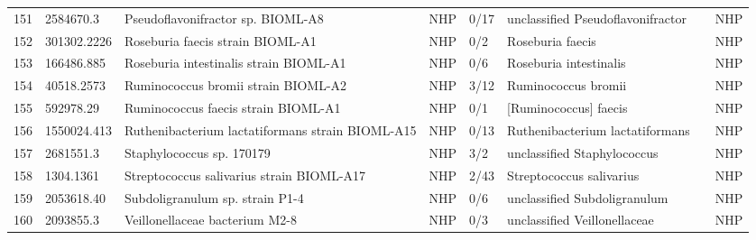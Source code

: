 \begin{longtable}{llllllll}
151 &     2584670.3 &                                        Pseudoflavonifractor sp. BIOML-A8 &   NHP &      0/17 &              unclassified Pseudoflavonifractor &      \cite{poyet2019library,ricaboni2017pseudoflavonifractor} &   NHP \\
152 &   301302.2226 &                                         Roseburia faecis strain BIOML-A1 &   NHP &       0/2 &                               Roseburia faecis &                    \cite{poyet2019library,duncan2006proposal} &   NHP \\
153 &    166486.885 &                                   Roseburia intestinalis strain BIOML-A1 &   NHP &       0/6 &                         Roseburia intestinalis &                           \cite{poyet2019library,la2019human} &   NHP \\
154 &    40518.2573 &                                      Ruminococcus bromii strain BIOML-A2 &   NHP &      3/12 &                            Ruminococcus bromii &                          \cite{poyet2019library,ze2015unique} &   NHP \\
155 &     592978.29 &                                      Ruminococcus faecis strain BIOML-A1 &   NHP &       0/1 &                          [Ruminococcus] faecis &                   \cite{poyet2019library,kim2011ruminococcus} &   NHP \\
156 &   1550024.413 &                         Ruthenibacterium lactatiformans strain BIOML-A15 &   NHP &      0/13 &                Ruthenibacterium lactatiformans &         \cite{poyet2019library,shkoporov2016ruthenibacterium} &   NHP \\
157 &     2681551.3 &                                                Staphylococcus sp. 170179 &   NHP &       3/2 &                    unclassified Staphylococcus &                                 \cite{pain2020staphylococcus} &   NHP \\
158 &     1304.1361 &                                Streptococcus salivarius strain BIOML-A17 &   NHP &      2/43 &                       Streptococcus salivarius &                          \cite{poyet2019library,kaci2014anti} &   NHP \\
159 &    2053618.40 &                                          Subdoligranulum sp. strain P1-4 &   NHP &       0/6 &                   unclassified Subdoligranulum &                           \cite{holmstrom2004subdoligranulum} &   NHP \\
160 &     2093855.3 &                                           Veillonellaceae bacterium M2-8 &   NHP &       0/3 &                   unclassified Veillonellaceae &                           \cite{glascock2020unique,2093855.3} &   NHP \\

\end{longtable}
